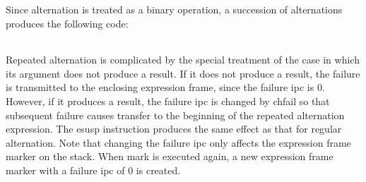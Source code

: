 \begin{noIndex}
\begin{center}
\begin{xtabular}{|m{1.9073598in}|m{2.75596in}|}
\end{xtabular}
\end{center}

Since alternation is treated as a binary operation, a succession of
alternations produces the following code:

\begin{center}
\tablelasttail{\hline}
\begin{xtabular}{|m{1.9073598in}|m{2.75596in}|}

\end{xtabular}
\end{center}

Repeated alternation is complicated by the special treatment of the
case in which its argument does not produce a result. If it does not
produce a result, the failure is transmitted to the enclosing
expression frame, since the failure ipc is 0. However, if it produces
a result, the failure ipc is changed by chfail so that subsequent
failure causes transfer to the beginning of the repeated alternation
expression. The esusp instruction produces the same effect as that for
regular alternation. Note that changing the failure ipc only affects
the expression frame marker on the stack. When mark is executed again,
a new expression frame marker with a failure ipc of 0 is created.


\end{noIndex}
